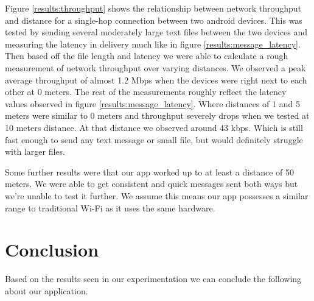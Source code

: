 \documentclass[10pt]{article}
\begin{document}
Figure \ref{results:throughput} shows the relationship between network throughput and distance for a single-hop connection between two android devices. This was tested by sending several moderately large text files between the two devices and measuring the latency in delivery much like in figure \ref{results:message_latency}. Then based off the file length and latency we were able to calculate a rough measurement of network throughput over varying distances. We observed a peak average throughput of almost 1.2 Mbps when the devices were right next to each other at 0 meters. The rest of the measurements roughly reflect the latency values observed in figure \ref{results:message_latency}. Where distances of 1 and 5 meters were similar to 0 meters and throughput severely drops when we tested at 10 meters distance. At that distance we observed around 43 kbps. Which is still fast enough to send any text message or small file, but would definitely struggle with larger files.

Some further results were that our app worked up to at least a distance of 50 meters. We were able to get consistent and quick messages sent both ways but we're unable to test it further. We assume this means our app possesses a similar range to traditional Wi-Fi as it uses the same hardware.

\section{Conclusion}




Based on the results seen in our experimentation we can conclude the following about our application.

\renewcommand{\refname} {\section{References}}

{}
\end{document}
